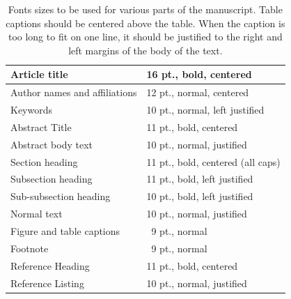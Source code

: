 \documentclass[nocompress]{spie}  %
\begin{document}
\begin{table}[ht]
\caption{Fonts sizes to be used for various parts of the manuscript.  Table captions should be centered above the table.  When the caption is too long to fit on one line, it should be justified to the right and left margins of the body of the text.} 
\label{tab:fonts}
\begin{center}       
\begin{tabular}{|l|l|} %
\hline
\rule[-1ex]{0pt}{3.5ex}  Article title & 16 pt., bold, centered  \\
\hline
\rule[-1ex]{0pt}{3.5ex}  Author names and affiliations & 12 pt., normal, centered   \\
\hline
\rule[-1ex]{0pt}{3.5ex}  Keywords & 10 pt., normal, left justified   \\
\hline
\rule[-1ex]{0pt}{3.5ex}  Abstract Title & 11 pt., bold, centered   \\
\hline
\rule[-1ex]{0pt}{3.5ex}  Abstract body text & 10 pt., normal, justified   \\
\hline
\rule[-1ex]{0pt}{3.5ex}  Section heading & 11 pt., bold, centered (all caps)  \\
\hline
\rule[-1ex]{0pt}{3.5ex}  Subsection heading & 11 pt., bold, left justified  \\
\hline
\rule[-1ex]{0pt}{3.5ex}  Sub-subsection heading & 10 pt., bold, left justified  \\
\hline
\rule[-1ex]{0pt}{3.5ex}  Normal text & 10 pt., normal, justified  \\
\hline
\rule[-1ex]{0pt}{3.5ex}  Figure and table captions & \, 9 pt., normal \\
\hline
\rule[-1ex]{0pt}{3.5ex}  Footnote & \, 9 pt., normal \\
\hline 
\rule[-1ex]{0pt}{3.5ex}  Reference Heading & 11 pt., bold, centered   \\
\hline
\rule[-1ex]{0pt}{3.5ex}  Reference Listing & 10 pt., normal, justified   \\
\hline
\end{tabular}
\end{center}
\end{table} 
\end{document}
